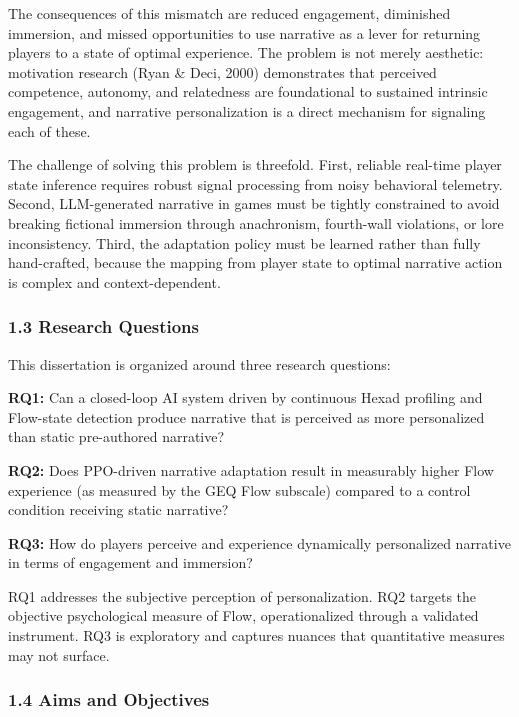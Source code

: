 The consequences of this mismatch are reduced engagement, diminished
immersion, and missed opportunities to use narrative as a lever for
returning players to a state of optimal experience. The problem is not
merely aesthetic: motivation research (Ryan \& Deci, 2000) demonstrates
that perceived competence, autonomy, and relatedness are foundational to
sustained intrinsic engagement, and narrative personalization is a
direct mechanism for signaling each of these.

The challenge of solving this problem is threefold. First, reliable
real-time player state inference requires robust signal processing from
noisy behavioral telemetry. Second, LLM-generated narrative in games
must be tightly constrained to avoid breaking fictional immersion
through anachronism, fourth-wall violations, or lore inconsistency.
Third, the adaptation policy must be learned rather than fully
hand-crafted, because the mapping from player state to optimal narrative
action is complex and context-dependent.

\subsubsection{1.3 Research Questions}\label{research-questions}

This dissertation is organized around three research questions:

\textbf{RQ1:} Can a closed-loop AI system driven by continuous Hexad
profiling and Flow-state detection produce narrative that is perceived
as more personalized than static pre-authored narrative?

\textbf{RQ2:} Does PPO-driven narrative adaptation result in measurably
higher Flow experience (as measured by the GEQ Flow subscale) compared
to a control condition receiving static narrative?

\textbf{RQ3:} How do players perceive and experience dynamically
personalized narrative in terms of engagement and immersion?

RQ1 addresses the subjective perception of personalization. RQ2 targets
the objective psychological measure of Flow, operationalized through a
validated instrument. RQ3 is exploratory and captures nuances that
quantitative measures may not surface.

\subsubsection{1.4 Aims and Objectives}\label{aims-and-objectives}

